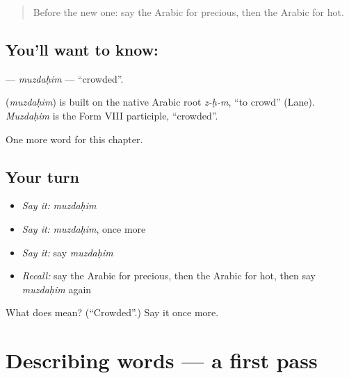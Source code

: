\label{lesson:AR-C155-muzdahim}



\begin{quote}
Before the new one: say the Arabic for precious, then the Arabic for hot.
\end{quote}

\subsection*{You'll want to know: }
\textbf{} — \emph{muzdaḥim} — \textquotedblleft{}crowded\textquotedblright{}.

\begin{cousinweb}
\textbf{} (\emph{muzdaḥim}) is built on the native Arabic root \emph{z-ḥ-m}, \textquotedblleft{}to crowd\textquotedblright{} (Lane). \emph{Muzdaḥim} is the Form VIII participle, \textquotedblleft{}crowded\textquotedblright{}.
\end{cousinweb}

\begin{grammarlens}[title={What you've built}]
One more word for this chapter.
\end{grammarlens}

\subsection*{Your turn}
\begin{itemize}
\raggedright
  \item \emph{Say it:} \emph{muzdaḥim}
  \item \emph{Say it:} \emph{muzdaḥim}, once more
  \item \emph{Say it:} say \emph{muzdaḥim}
  \item \emph{Recall:} say the Arabic for precious, then the Arabic for hot, then say \emph{muzdaḥim} again
\end{itemize}

\begin{tcolorbox}[breakable,colback=teal!4,colframe=teal!35!black,title={Before you move on}]
What does  mean? (\textquotedblleft{}Crowded\textquotedblright{}.) Say it once more.
\end{tcolorbox}
\section[(dialogue)]{Describing words — a first pass}

\label{lesson:AR-R155-first-pass-describing-words}




